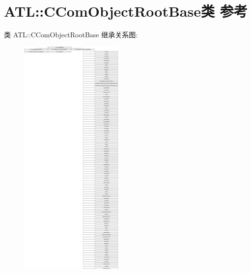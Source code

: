 \hypertarget{class_a_t_l_1_1_c_com_object_root_base}{}\section{A\+TL\+:\+:C\+Com\+Object\+Root\+Base类 参考}
\label{class_a_t_l_1_1_c_com_object_root_base}
类 A\+TL\+:\+:C\+Com\+Object\+Root\+Base 继承关系图\+:\begin{figure}[H]
\begin{center}
\leavevmode
\includegraphics[height=12.000000cm]{class_a_t_l_1_1_c_com_object_root_base}
\end{center}
\end{figure}
